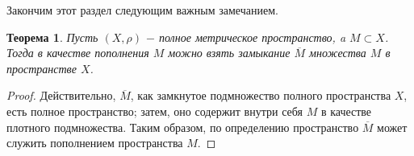 \documentclass{article}
\newtheorem{theorem}{Теорема}[section]
\begin{document}
Закончим этот раздел следующим важным замечанием.

\begin{theorem}
Пусть \((X, \rho)\) \(-\) полное метрическое пространство, a \(M \subset X\). Тогда в качестве пополнения \(M\) можно взять замыкание \(\overline{M}\) множества \(M\) в пространстве \(X\).
\end{theorem}

\begin{proof}
Действительно, \(\overline{M}\), как замкнутое подмножество полного пространства \(X\), есть полное пространство; затем, оно содержит внутри себя \(M\) в качестве плотного подмножества. Таким образом, по определению пространство \(\overline{M}\) может служить пополнением пространства \(M\).
\end{proof}
\end{document}
